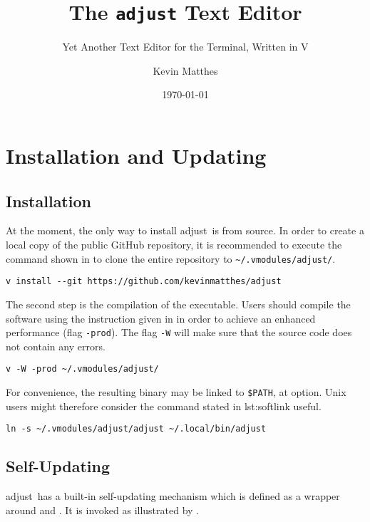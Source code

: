 \documentclass[11pt, a4paper, british]{scrartcl}
\author{Kevin Matthes}
\date{\today}
\subtitle{Yet Another Text Editor for the Terminal, Written in V}
\title{The \texttt{adjust} Text Editor}
\DeclareRobustCommand{\adjust}{\textsf{adjust}}
\begin{document}
\maketitle
\tableofcontents


\section{Installation and Updating}
\label{sec:installation-and-updating}
\subsection{Installation}
\label{sec:installation}
At the moment, the only way to install \adjust\ is from source.  In order to
create a local copy of the public GitHub repository, it is recommended to
execute the command shown in  to clone the entire repository
to \texttt{\textasciitilde/.vmodules/adjust/}.

\begin{lstlisting}[caption = Downloading \adjust, label = lst:download]
v install --git https://github.com/kevinmatthes/adjust
\end{lstlisting}

The second step is the compilation of the executable.  Users should compile the
software using the instruction given in  in order to
achieve an enhanced performance (flag \texttt{-prod}).  The flag \texttt{-W}
will make sure that the source code does not contain any errors.

\begin{lstlisting}[caption = Compiling \adjust, label = lst:compilation]
v -W -prod ~/.vmodules/adjust/
\end{lstlisting}

For convenience, the resulting binary may be linked to \texttt{\$PATH}, at
option.  Unix users might therefore consider the command stated in \Vref
{lst:softlink} useful.

\begin{lstlisting}[caption = Softlinking \adjust, label = lst:softlink]
ln -s ~/.vmodules/adjust/adjust ~/.local/bin/adjust
\end{lstlisting}

\subsection{Self-Updating}
\label{sec:self-updating}
\adjust\ has a built-in self-updating mechanism which is defined as a wrapper
around  and .  It is invoked as
illustrated by .
\end{document}
